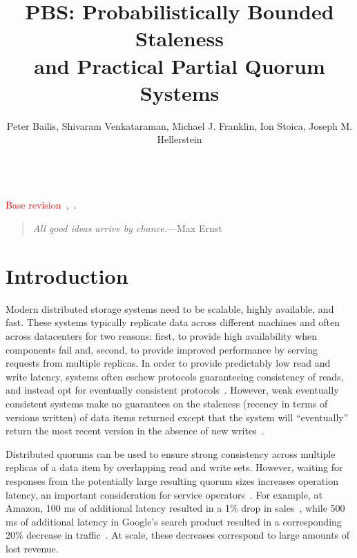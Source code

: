 \documentclass{vldb}
\title{PBS: Probabilistically Bounded Staleness\\ and Practical Partial Quorum Systems}
\author{Peter Bailis, Shivaram Venkataraman, Michael J. Franklin, Ion Stoica, Joseph M. Hellerstein\\
\affaddr{University of California, Berkeley}\\
\affaddr{\{pbailis, shivaram, franklin, istoica, hellerstein\}@cs.berkeley.edu}}
\newcommand{\sectionskip}{-0em}
\begin{document}

\maketitle


\textcolor{red}{Base revision~\GITAbrHash,~\GITAuthorDate.\\[-2em]}

\begin{quote}
\textit{All good ideas arrive by chance.}---Max Ernst
\end{quote}



\vspace{\sectionskip}\section{Introduction}

Modern distributed storage systems need to be scalable, highly
available, and fast.  These systems typically replicate data across
different machines and often across datacenters for two reasons:
first, to provide high availability when components fail and, second,
to provide improved performance by serving requests from multiple
replicas.  In order to provide predictably low read and write latency,
systems often eschew protocols guaranteeing consistency of reads, and
instead opt for eventually consistent
protocols~\cite{cassandradefault, abadilatconsist, dynamo, feinbergpc,
  reddit, riaktalkone, outbrain}.  However, weak eventually consistent
systems make no guarantees on the staleness (recency in terms of
versions written) of data items returned except that the system will
``eventually'' return the most recent version in the absence of new
writes~\cite{vogels-defs}.

Distributed quorums can be used to ensure strong consistency across
multiple replicas of a data item by overlapping read and write
sets. However, waiting for responses from the potentially large
resulting quorum sizes increases operation latency, an important
consideration for service operators~\cite{perf-impact}. For example, at Amazon, 100 ms of
additional latency resulted in a 1\% drop in
sales~\cite{amazon-latency}, while 500 ms of additional latency in
Google's search product resulted in a corresponding 20\% decrease in
traffic~\cite{google-talk}.  At scale, these decreases correspond to
large amounts of lost revenue.
\end{document}

